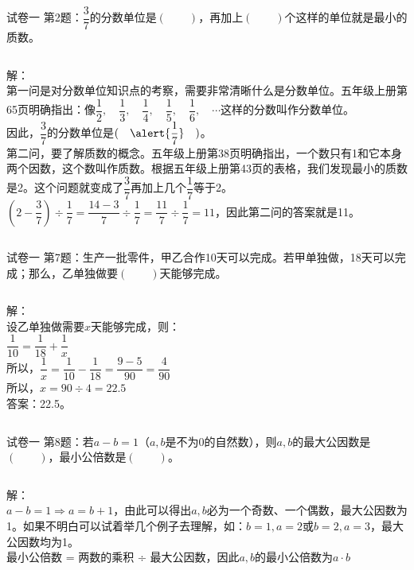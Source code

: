 \documentclass[aspectratio=169]{ctexbeamer} %
\date{\today}
\begin{document}
\begin{frame}[t]{试卷一}
第2题：$\dfrac{3}{7}$的分数单位是$(\qquad)$，再加上$(\qquad)$个这样的单位就是最小的质数。
\pause
\begin{columns}
解：\\
第一问是对分数单位知识点的考察，需要非常清晰什么是分数单位。\alert{五年级上册第65页}明确指出：像$\dfrac{1}{2}, \quad \dfrac{1}{3}, \quad \dfrac{1}{4}, \quad \dfrac{1}{5}, \quad \dfrac{1}{6}, \quad \cdots$这样的分数叫作\alert{分数单位}。\\
因此，$\dfrac{3}{7}$的分数单位是$(\quad \alert{\dfrac{1}{7}} \quad )$。\\
\pause
第二问，要了解质数的概念。\alert{五年级上册第38页}明确指出，一个数只有1和它本身两个因数，这个数叫作\alert{质数}。根据\alert{五年级上册第43页}的表格，我们发现最小的质数是\alert{2}。这个问题就变成了$\dfrac{3}{7}$再加上几个$\dfrac{1}{7}$等于2。\\
$\left(2 - \dfrac{3}{7}\right) \div \dfrac{1}{7} = \dfrac{14 -3}{7} \div \dfrac{1}{7} = \dfrac{11}{7} \div \dfrac{1}{7}= 11$，因此第二问的答案就是\alert{11}。
\end{columns}
\end{frame}


\begin{frame}[t]{试卷一}
第7题：生产一批零件，甲乙合作10天可以完成。若甲单独做，18天可以完成；那么，乙单独做要$(\qquad)$天能够完成。
\pause
\begin{columns}
\pause
解：\\
设乙单独做需要$x$天能够完成，则： \\
$\dfrac{1}{10} = \dfrac{1}{18} + \dfrac{1}{x}$ \\
所以，$ \dfrac{1}{x} = \dfrac{1}{10} - \dfrac{1}{18} = \dfrac{9-5}{90} = \dfrac{4}{90}$ \\
所以，$x = 90 \div 4 = 22.5$ \\
答案：\alert{22.5}。
\end{columns}
\end{frame}

\begin{frame}[t]{试卷一}
第8题：若$a - b = 1$（$a, b$是不为$0$的自然数），则$a, b$的最大公因数是$(\qquad)$，最小公倍数是$(\qquad)$。
\pause
\begin{columns}
解：\\
$a - b = 1 \Rightarrow a = b + 1$，由此可以得出$a, b$必为一个奇数、一个偶数，最大公因数为1。如果不明白可以试着举几个例子去理解，如：$b = 1, a = 2$或$b = 2, a = 3$，最大公因数均为\alert{1}。\\
\pause
最小公倍数 = 两数的乘积 ÷ 最大公因数，因此$a, b$的最小公倍数为\alert{$a \cdot b$}
\end{columns}
\end{frame}
\end{document}
